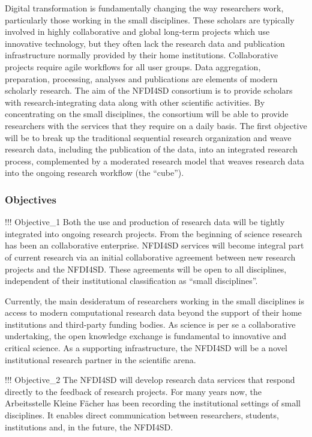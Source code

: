 Digital transformation is fundamentally changing the way researchers
work, particularly those working in the small disciplines. These
scholars are typically involved in highly collaborative and global
long-term projects which use innovative technology, but they often lack
the research data and publication infrastructure normally provided by
their home institutions. Collaborative projects require agile workflows
for all user groups. Data aggregation, preparation, processing, analyses
and publications are elements of modern scholarly research. The aim of
the NFDI4SD consortium is to provide scholars with research-integrating
data along with other scientific activities. By concentrating on the
small disciplines, the consortium will be able to provide researchers
with the services that they require on a daily basis. The first
objective will be to break up the traditional sequential research
organization and weave research data, including the publication of the
data, into an integrated research process, complemented by a moderated
research model that weaves research data into the ongoing research
workflow (the ``cube'').

\hypertarget{objectives}{%
\subsubsection{Objectives}\label{objectives}}

!!! Objective\_1 Both the use and production of research data will be
tightly integrated into ongoing research projects. From the beginning of
science research has been an collaborative enterprise. NFDI4SD services
will become integral part of current research via an initial
collaborative agreement between new research projects and the NFDI4SD.
These agreements will be open to all disciplines, independent of their
institutional classification as ``small disciplines''.

Currently, the main desideratum of researchers working in the small
disciplines is access to modern computational research data beyond the
support of their home institutions and third-party funding bodies. As
science is per se a collaborative undertaking, the open knowledge
exchange is fundamental to innovative and critical science. As a
supporting infrastructure, the NFDI4SD will be a novel institutional
research partner in the scientific arena.

!!! Objective\_2 The NFDI4SD will develop research data services that
respond directly to the feedback of research projects. For many years
now, the Arbeitsstelle Kleine Fächer has been recording the
institutional settings of small disciplines. It enables direct
communication between researchers, students, institutions and, in the
future, the NFDI4SD.

